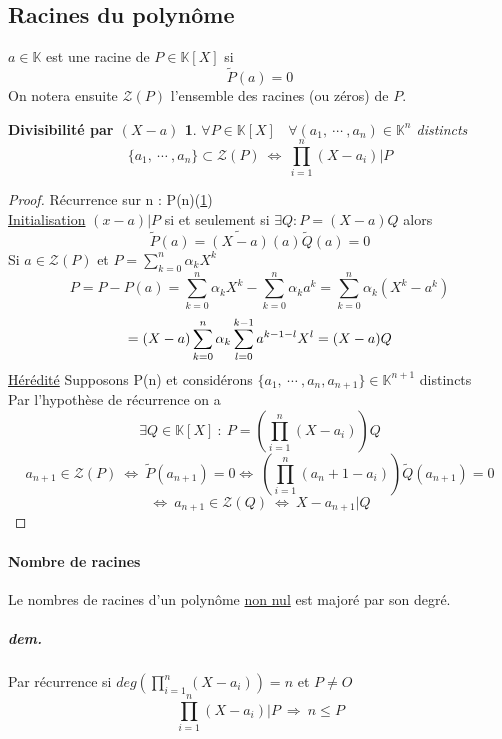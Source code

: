 		\subsection{Racines du polynôme}
			$a\in\mathbb{K}$ est une racine de $P\in\mathbb{K} [X]$ si \[\widetilde{P}(a) = 0\]
			On notera ensuite $\mathcal{Z}(P)$ l'ensemble des racines (ou zéros) de $P$.
			\newtheorem{th11}{Divisibilité par $(X-a)$}
			\begin{th11}\label{Div X-a}
				$\forall P\in\mathbb{K}[X] ~~~~ \forall (a_1,~\cdots ~,a_n)\in\mathbb{K}^n$ 
				distincts \[\{a_1,~\cdots ~,a_n\} \subset \mathcal{Z}(P) ~\Leftrightarrow ~
				\prod\limits_{i=1}^n (X-a_i)\vert P\]
			\end{th11}
			\begin{proof}
			Récurrence sur n : P(n)(\ref{Div X-a})\\
			\underline{Initialisation} \hspace*{10pt}
			$(x-a)\vert P$ si et seulement si $\exists Q : P=(X-a)Q$ alors
			\[\widetilde{P}(a) = \widetilde{(X-a)}(a)\widetilde{Q}(a) = 0\]
			Si $a\in\mathcal{Z}(P)$ et $P=\sum\limits_{k=0}^n \alpha_k X^k$
			\[P = P-P(a) = \sum\limits_{k=0}^n \alpha_k X^k - \sum\limits_{k=0}^n \alpha_k a^k 
			= \sum\limits_{k=0}^n \alpha_k (X^k - a^k) \]
			\[= (X-a)\sum\limits_{k=0}^n \alpha_k \sum\limits_{l=0}^{k-1} a^{k-1-l} X^l = 
			(X-a)Q\vspace*{20pt}\]
			\underline{Hérédité} \hspace*{10pt} Supposons P(n) et considérons
			$\{a_1, ~\cdots ~,a_n,a_{n+1}\}\in\mathbb{K}^{n+1}$ distincts \\
			Par l'hypothèse de récurrence on a 
			\[\exists Q\in\mathbb{K}[X] ~:~ P=(\prod\limits_{i=1}^n (X-a_i))Q\]
			\[ a_{n+1} \in\mathcal{Z}(P) ~\Leftrightarrow ~\widetilde{P}(a_{n+1}) = 0
			\Leftrightarrow ~(\prod\limits_{i=1}^n (a_n+1-a_i))\widetilde{Q}(a_{n+1})=0\]
			\[ \Leftrightarrow ~a_{n+1} \in\mathcal{Z}(Q) ~\Leftrightarrow ~X-a_{n+1}\vert Q\]
			\end{proof}
			\paragraph{Nombre de racines}
				Le nombres de racines d'un polynôme \underline{non nul} est majoré par son degré.
				\subparagraph{dem.}
				 Par récurrence si $deg(\prod\limits_{i=1}^n (X-a_i)) = n$ et $P\neq O$
				 \[\prod\limits_{i=1}^n (X-a_i)\vert P ~\Longrightarrow ~n\leq P\]
